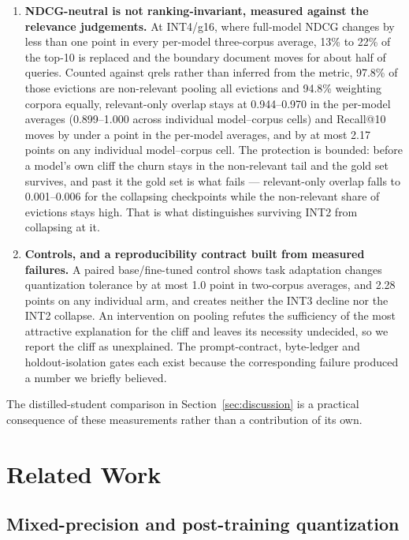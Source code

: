 \documentclass[11pt]{article}
\begin{document}
\begin{enumerate}
\item \textbf{NDCG-neutral is not ranking-invariant, measured against the relevance
judgements.} At INT4/g16, where full-model NDCG changes by less than one point in every
per-model three-corpus average, 13\% to 22\% of the top-10 is
replaced and the boundary document moves for about half of queries. Counted against qrels
rather than inferred from the metric, 97.8\% of those evictions are non-relevant pooling all
evictions and 94.8\% weighting corpora equally, relevant-only overlap stays at 0.944--0.970
in the per-model averages (0.899--1.000 across individual model--corpus cells) and
Recall@10 moves by under a point in the per-model averages, and by at most 2.17 points on
any individual model--corpus cell. The protection is bounded: before a model's own cliff the churn stays
in the non-relevant tail and the gold set survives, and past it the gold set is what fails ---
relevant-only overlap falls to 0.001--0.006 for the collapsing checkpoints while the
non-relevant share of evictions stays high. That is what distinguishes surviving INT2 from
collapsing at it.

\item \textbf{Controls, and a reproducibility contract built from measured failures.} A paired
base/fine-tuned control shows task adaptation changes quantization tolerance by at most 1.0
point in two-corpus averages, and 2.28 points on any individual arm, and creates neither the INT3 decline nor the INT2 collapse. An intervention on pooling
refutes the sufficiency of the most attractive explanation for the cliff and leaves its
necessity undecided, so we report the cliff as unexplained. The prompt-contract, byte-ledger and
holdout-isolation gates each exist because the corresponding failure produced a number we
briefly believed.
\end{enumerate}

The distilled-student comparison in Section~\ref{sec:discussion} is a practical consequence of
these measurements rather than a contribution of its own.

\section{Related Work}

\subsection{Mixed-precision and post-training quantization}
\end{document}
